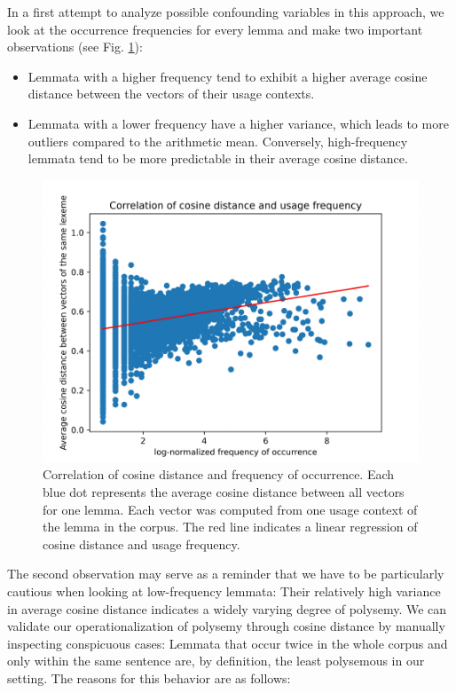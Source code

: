\documentclass[runningheads]{llncs}
\begin{document}
In a first attempt to analyze possible confounding variables in this approach, we look at the occurrence frequencies for every lemma and make two important observations (see Fig. \ref{figure:cosineDistanceVsFrequency}):
\begin{itemize}
	\item Lemmata with a higher frequency tend to exhibit a higher average cosine distance between the vectors of their usage contexts.
	\item Lemmata with a lower frequency have a higher variance, which leads to more outliers compared to the arithmetic mean. Conversely, high-frequency lemmata tend to be more predictable in their average cosine distance.
\end{itemize}
\begin{figure}[ht]
	\includegraphics[width=\linewidth]{cos_dist_vs_freq}
	\caption{Correlation of cosine distance and frequency of occurrence. Each blue dot represents the average cosine distance between all vectors for one lemma. Each vector was computed from one usage context of the lemma in the corpus. The red line indicates a linear regression of cosine distance and usage frequency.}
	\label{figure:cosineDistanceVsFrequency}
\end{figure}
The second observation may serve as a reminder that we have to be particularly cautious when looking at low-frequency lemmata: Their relatively high variance in average cosine distance indicates a widely varying degree of polysemy. We can validate our operationalization of polysemy through cosine distance by manually inspecting conspicuous cases: Lemmata that occur twice in the whole corpus and only within the same sentence are, by definition, the least polysemous in our setting. The reasons for this behavior are as follows:
\end{document}
